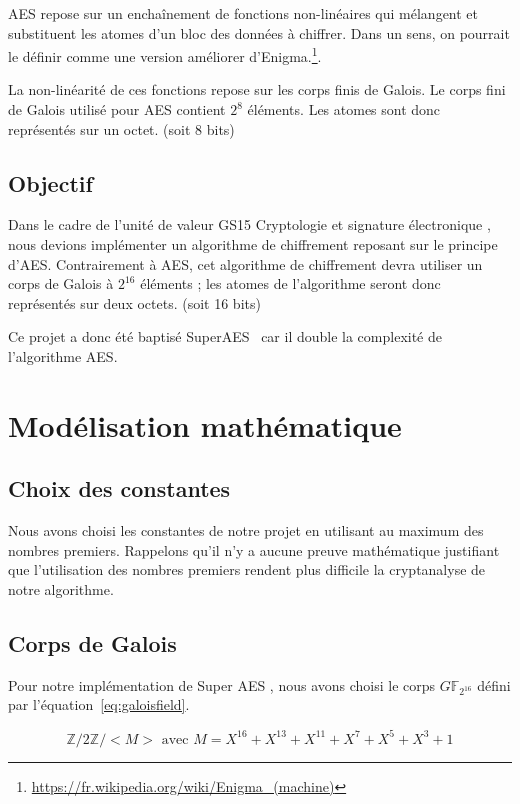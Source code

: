 \documentclass[12pt,a4paper]{report}
\begin{document}
AES repose sur un enchaînement de fonctions non-linéaires qui mélangent et substituent les
atomes d'un bloc des données à chiffrer. Dans un sens, on pourrait le définir comme une
version améliorer d'Enigma.\footnote{\url{https://fr.wikipedia.org/wiki/Enigma_(machine)}}.

La non-linéarité de ces fonctions repose sur les corps finis de Galois. Le
corps fini de Galois utilisé pour AES contient $2^{8}$ éléments. Les atomes
sont donc représentés sur un octet. (soit 8 bits)

\section{Objectif}

Dans le cadre de l'unité de valeur GS15 \og Cryptologie et signature
électronique \fg, nous devions implémenter un algorithme de chiffrement
reposant sur le principe d'AES. Contrairement à AES, cet algorithme de
chiffrement devra utiliser un corps de Galois à $2^{16}$ éléments ; les atomes
de l'algorithme seront donc représentés sur deux octets. (soit 16 bits)

Ce projet a donc été baptisé \og SuperAES \fg\ car il double la complexité de
l'algorithme AES.


\chapter{Modélisation mathématique}

\section{Choix des constantes}

Nous avons choisi les constantes de notre projet en utilisant au maximum des
nombres premiers. Rappelons qu'il n'y a aucune preuve mathématique justifiant
que l'utilisation des nombres premiers rendent plus difficile la cryptanalyse
de notre algorithme.

\section{Corps de Galois}

Pour notre implémentation de \og Super AES \fg, nous avons choisi le corps
$G\mathbb{F}_{2^{16}}$ défini par l'équation~\ref{eq:galoisfield}.

\begin{equation}
\label{eq:galoisfield}
\mathbb{Z}/2\mathbb{Z}/<M> \mbox{ avec } M = X^{16} + X^{13} + X^{11} + X^{7} + X^{5} + X^{3} + 1
\end{equation}
\end{document}
